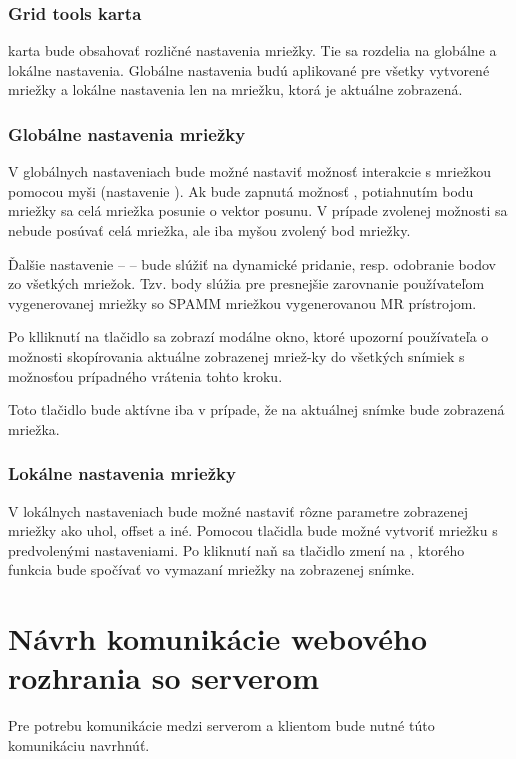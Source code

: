 \subsubsection {Grid tools karta}
 karta bude obsahovať rozličné nastavenia mriežky. Tie sa rozdelia na globálne a lokálne nastavenia. Globálne nastavenia budú aplikované pre všetky vytvorené mriežky a lokálne nastavenia len na mriežku, ktorá je aktuálne zobrazená.

\subsubsection*{Globálne nastavenia mriežky}
V globálnych nastaveniach bude možné nastaviť možnosť interakcie s mriežkou pomocou myši (nastavenie ). Ak bude zapnutá možnosť , potiahnutím bodu mriežky sa celá mriežka posunie o vektor posunu. V prípade zvolenej možnosti  sa nebude posúvať celá mriežka, ale iba myšou zvolený bod mriežky.

Ďalšie nastavenie --  -- bude slúžiť na dynamické pridanie, resp. odobranie  bodov zo všetkých mriežok. Tzv.  body slúžia pre presnejšie zarovnanie používateľom vygenerovanej mriežky so SPAMM mriežkou vygenerovanou MR prístrojom.

Po klliknutí na tlačidlo  sa zobrazí modálne okno, ktoré upozorní používateľa o možnosti skopírovania aktuálne zobrazenej mriež-\newline ky do všetkých snímiek s možnosťou prípadného vrátenia tohto kroku.

Toto tlačidlo bude aktívne iba v prípade, že na aktuálnej snímke bude zobrazená mriežka.

\subsubsection* {Lokálne nastavenia mriežky}
V lokálnych nastaveniach bude možné nastaviť rôzne parametre zobrazenej mriežky ako uhol, offset a iné. Pomocou tlačidla  bude možné vytvoriť mriežku s predvolenými nastaveniami. Po kliknutí naň sa tlačidlo zmení na , ktorého funkcia bude spočívať vo vymazaní mriežky na zobrazenej snímke.

\section {Návrh komunikácie webového rozhrania so serverom}\label{api_endpoint}
Pre potrebu komunikácie medzi serverom a klientom bude nutné túto komunikáciu navrhnúť. 


